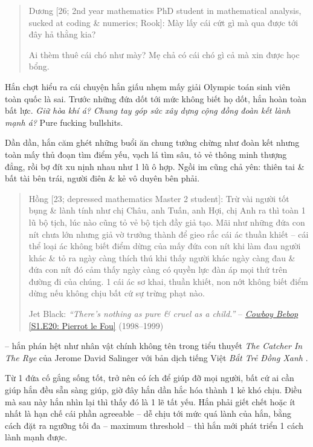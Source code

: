 \documentclass[12pt,oneside]{book}
\begin{document}
\begin{quote}
	{\sf Dương [26; 2nd year mathematics PhD student in mathematical analysis, sucked at coding \& numerics; Rook]}: Mày lấy cái cứt gì mà qua được tới đây hả thằng kia?
	
	Ai thèm thuê cái chó như mày? Mẹ chả có cái chó gì cả mà xin được học bổng.
\end{quote}
Hắn chợt hiểu ra cái chuyện hắn giấu nhẹm mấy giải Olympic toán sinh viên toàn quốc là sai. Trước những đứa dốt tới mức không biết họ dốt, hắn hoàn toàn bất lực. {\it Giữ hòa khí á? Chung tay góp sức xây dựng cộng đồng đoàn kết lành mạnh á?} Pure fucking bullshits.

Dần dần, hắn căm ghét những buổi ăn chung tưởng chừng như đoàn kết nhưng toàn mấy thủ đoạn tìm điểm yếu, vạch lá tìm sâu, tỏ vẻ thông minh thượng đẳng, rồi bợ đít xu nịnh nhau như 1 lũ ô hợp. Ngồi im cũng chả yên: thiên tai \& bất tài bên trái, người điên \& kẻ vô duyên bên phải.
\begin{quote}
	{\sf Hồng [23; depressed mathematics Master 2 student]}: Trừ vài người tốt bụng \& lành tính như chị Châu, anh Tuấn, anh Hợi, chị Anh ra thì toàn 1 lũ bộ tịch, lúc nào cũng tỏ vẻ bộ tịch đầy giả tạo. Mãi như những đứa con nít chưa lớn nhưng giả vờ trưởng thành để gieo rắc cái ác thuần khiết -- cái thể loại ác không biết điểm dừng của mấy đứa con nít khi làm đau người khác \& tỏ ra ngày càng thích thú khi thấy người khác ngày càng đau \& đứa con nít đó cảm thấy ngày càng có quyền lực đàn áp mọi thứ trên đường đi của chúng. 1 cái ác sơ khai, thuần khiết, non nớt không biết điểm dừng nếu không chịu bất cứ sự trừng phạt nào.
	
	{\sf Jet Black}: {\it``There's nothing as pure \& cruel as a child.''} -- \href{https://www.imdb.com/title/tt0618976}{{\it Cowboy Bebop} [S1.E20: Pierrot le Fou]} (1998--1999)
\end{quote}
-- hắn phán hệt như nhân vật chính không tên trong tiểu thuyết {\it The Catcher In The Rye} \cite{Salinger_catcher_in_rye} của {\sc Jerome David Salinger} với bản dịch tiếng Việt {\it Bắt Trẻ Đồng Xanh} \cite{Salinger_btdx}.

Từ 1 đứa cố gắng sống tốt, trở nên có ích để giúp đỡ mọi người, bất cứ ai cần giúp hắn đều sẵn sàng giúp, giờ đây hắn dần hắc hóa thành 1 kẻ khó chịu. Điều mà sau này hắn nhìn lại thì thấy đó là 1 lẽ tất yếu. Hắn phải giết chết hoặc ít nhất là hạn chế cái phần agreeable -- dễ chịu tới mức quá lành của hắn, bằng cách đặt ra ngưỡng tối đa -- maximum threshold -- thì hắn mới phát triển 1 cách lành mạnh được.
\end{document}
